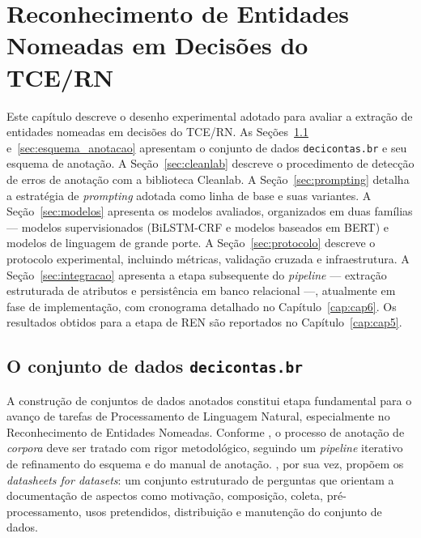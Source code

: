 \chapter{Reconhecimento de Entidades Nomeadas em Decisões do TCE/RN}
\label{cap:cap4}

Este capítulo descreve o desenho experimental adotado para avaliar a extração de entidades nomeadas em decisões do TCE/RN. As Seções~\ref{sec:dataset_decicontas} e~\ref{sec:esquema_anotacao} apresentam o conjunto de dados \texttt{decicontas.br} e seu esquema de anotação. A Seção~\ref{sec:cleanlab} descreve o procedimento de detecção de erros de anotação com a biblioteca Cleanlab. A Seção~\ref{sec:prompting} detalha a estratégia de \textit{prompting} adotada como linha de base e suas variantes. A Seção~\ref{sec:modelos} apresenta os modelos avaliados, organizados em duas famílias --- modelos supervisionados (BiLSTM-CRF e modelos baseados em BERT) e modelos de linguagem de grande porte. A Seção~\ref{sec:protocolo} descreve o protocolo experimental, incluindo métricas, validação cruzada e infraestrutura. A Seção~\ref{sec:integracao} apresenta a etapa subsequente do \textit{pipeline} --- extração estruturada de atributos e persistência em banco relacional ---, atualmente em fase de implementação, com cronograma detalhado no Capítulo~\ref{cap:cap6}. Os resultados obtidos para a etapa de REN são reportados no Capítulo~\ref{cap:cap5}.

\section{O conjunto de dados \texttt{decicontas.br}}
\label{sec:dataset_decicontas}

A construção de conjuntos de dados anotados constitui etapa fundamental para o avanço de tarefas de Processamento de Linguagem Natural, especialmente no Reconhecimento de Entidades Nomeadas. Conforme , o processo de anotação de \textit{corpora} deve ser tratado com rigor metodológico, seguindo um \textit{pipeline} iterativo de refinamento do esquema e do manual de anotação. , por sua vez, propõem os \textit{datasheets for datasets}: um conjunto estruturado de perguntas que orientam a documentação de aspectos como motivação, composição, coleta, pré-processamento, usos pretendidos, distribuição e manutenção do conjunto de dados.

